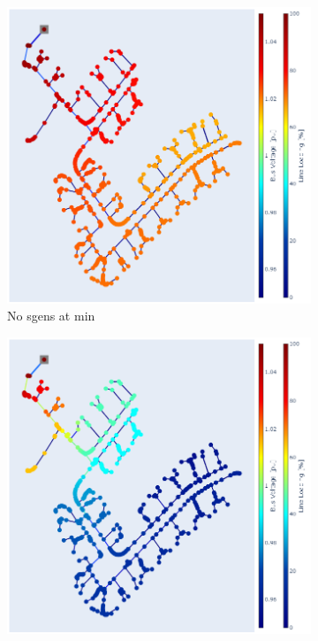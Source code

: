 \documentclass[a4paper,10pt]{report}
\begin{document}
\newpage
\begin{figure}
	\centering
	\begin{subfigure}[b]{0.475\textwidth}
		\centering
		\includegraphics[width=\textwidth]{hosting_cap_min_empty}
		\caption[]%
		{{\small No sgens at min}}    
		\label{fig:mean and std of net14}
	\end{subfigure}
	\hfill
	\begin{subfigure}[b]{0.475\textwidth}  
		\centering 
		\includegraphics[width=\textwidth]{hosting_cap_min_full}

\end{subfigure}
\end{figure}
\end{document}
